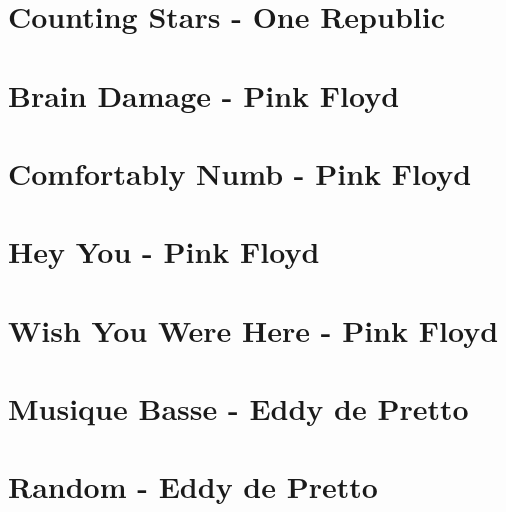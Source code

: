 \documentclass{guitartabs}
\begin{document}
\section{Counting Stars - One Republic}
\begin{guitar}

\end{guitar}

\section*{Brain Damage - Pink Floyd}
\begin{guitar}

\end{guitar}


\section{Comfortably Numb - Pink Floyd}
\begin{guitar}

\end{guitar}


\section{Hey You - Pink Floyd}
\begin{guitar}

\end{guitar}


\section{Wish You Were Here - Pink Floyd}
\begin{guitar}

\end{guitar}


\section{Musique Basse - Eddy de Pretto}
\begin{guitar}

\end{guitar}

\section{Random - Eddy de Pretto}
\begin{guitar}

\end{guitar}
\end{document}

